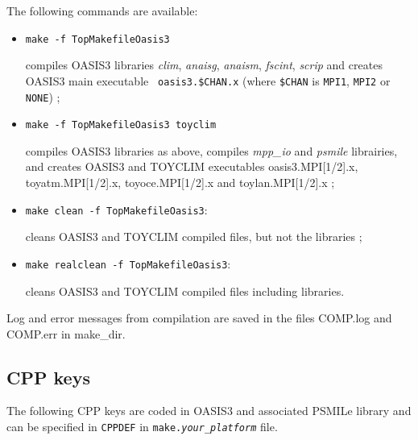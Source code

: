 The following commands are available:

\begin{itemize}
\item {\tt make -f TopMakefileOasis3} 

  compiles OASIS3 libraries {\it clim}, {\it anaisg}, {\it anaism},
  {\it fscint}, {\it scrip} and creates OASIS3 main executable {\tt
    oasis3.\$CHAN.x} (where {\tt \$CHAN} is {\tt MPI1}, {\tt MPI2} or
  {\tt NONE}) ;

\item {\tt make -f TopMakefileOasis3 toyclim}

  compiles OASIS3 libraries as above, compiles {\it mpp\_io} and {\it
    psmile} librairies, and creates OASIS3 and TOYCLIM executables
  oasis3.MPI[1/2].x, toyatm.MPI[1/2].x, toyoce.MPI[1/2].x and
  toylan.MPI[1/2].x ;

\item {\tt make clean -f TopMakefileOasis3}: 

  cleans OASIS3 and TOYCLIM compiled files, but not the libraries ;

\item {\tt make realclean -f  TopMakefileOasis3}: 

  cleans OASIS3 and TOYCLIM compiled files including libraries.

\end{itemize}

Log and error messages from compilation are saved in the files
COMP.log and COMP.err in make\_dir.

\subsection{CPP keys}
\label{subsec_CPP}

The following CPP keys are coded in OASIS3 and associated PSMILe library and
can be specified in {\tt CPPDEF} in {\tt make.{\it your\_platform}} file.

